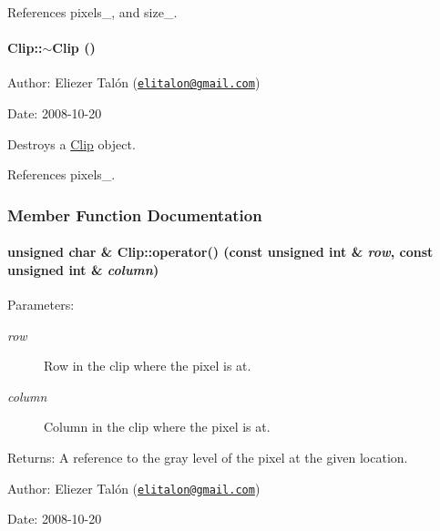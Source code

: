References pixels\_\-, and size\_\-.\hypertarget{class_clip_88647ed65e3482b5e0533ec98667b0fa}{
\paragraph[$\sim$Clip]{\setlength{\rightskip}{0pt plus 5cm}Clip::$\sim$Clip ()}\hfill}
\label{class_clip_88647ed65e3482b5e0533ec98667b0fa}


\begin{Desc}
\item[Author:]Eliezer Talón (\href{mailto:elitalon@gmail.com}{\tt elitalon@gmail.com}) \end{Desc}
\begin{Desc}
\item[Date:]2008-10-20\end{Desc}
Destroys a \hyperlink{class_clip}{Clip} object. 

References pixels\_\-.

\subsubsection{Member Function Documentation}
\hypertarget{class_clip_0f80c2b0f0f177fe9c780c93596f77be}{
\paragraph[operator()]{\setlength{\rightskip}{0pt plus 5cm}unsigned char \& Clip::operator() (const unsigned int \& {\em row}, \/  const unsigned int \& {\em column})}\hfill}
\label{class_clip_0f80c2b0f0f177fe9c780c93596f77be}


\begin{Desc}
\item[Parameters:]
\begin{description}
\item[{\em row}]Row in the clip where the pixel is at. \item[{\em column}]Column in the clip where the pixel is at.\end{description}
\end{Desc}
\begin{Desc}
\item[Returns:]A reference to the gray level of the pixel at the given location.\end{Desc}
\begin{Desc}
\item[Author:]Eliezer Talón (\href{mailto:elitalon@gmail.com}{\tt elitalon@gmail.com}) \end{Desc}
\begin{Desc}
\item[Date:]2008-10-20 \end{Desc}


